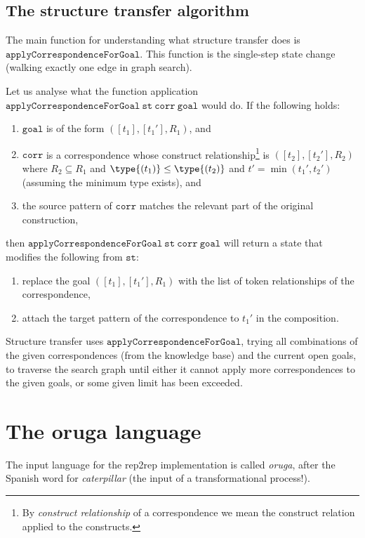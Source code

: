\documentclass[a4paper]{article}
\theoremstyle{definition}
\begin{document}
	\subsection{The structure transfer algorithm}
	The main function for understanding what structure transfer does is $\mathtt{applyCorrespondenceForGoal}$. This function is the single-step state change (walking exactly one edge in graph search).
	
	Let us analyse what the function application $\mathtt{applyCorrespondenceForGoal\ st\ corr\ goal}$ would do.
	If the following holds:
	\begin{enumerate}[itemsep=1pt]
		\item $\mathtt{goal}$ is of the form $([t_1],[t_1'],R_1)$, and
		\item $\mathtt{corr}$ is a correspondence whose construct relationship\footnote{By \textit{construct relationship} of a correspondence we mean the construct relation applied to the constructs.} is $([t_2],[t_2'],R_2)$ where $R_2 \subseteq R_1$ and $\type{(t_1)} \leq \type{(t_2)}$ and $t'=\min(t_1',t_2')$ (assuming the minimum type exists), and
		\item the source pattern of $\mathtt{corr}$ matches the relevant part of the original construction,
	\end{enumerate}
	then $\mathtt{applyCorrespondenceForGoal\ st\ corr\ goal}$ will return a state that modifies the following from $\mathtt{st}$:
	\begin{enumerate}[itemsep=1pt]
		\item replace the goal $([t_1],[t_1'],R_1)$ with the list of token relationships of the correspondence,
		\item attach the target pattern of the correspondence to $t_1'$ in the composition.
	\end{enumerate}
	
	Structure transfer uses $\mathtt{applyCorrespondenceForGoal}$, trying all combinations of the given correspondences (from the knowledge base) and the current open goals, to traverse the search graph until either it cannot apply more correspondences to the given goals, or some given limit has been exceeded. 
	
	\section{The oruga language}
	The input language for the rep2rep implementation is called \textit{oruga}, after the Spanish word for \textit{caterpillar} (the input of a transformational process!). 
	
\end{document}

